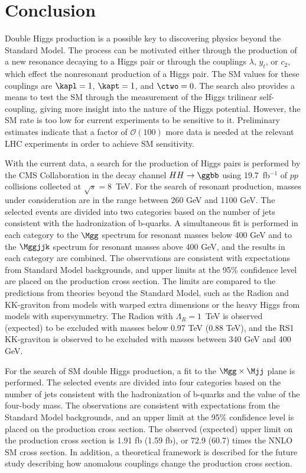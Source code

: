 
\chapter{Conclusion\label{ch:conclusion}}

Double Higgs production is a possible key to discovering physics beyond the Standard Model.
The process can be motivated either through the production of a new resonance decaying to
a Higgs pair or through the couplings $\lambda$, $y_t$, or $c_2$,
which effect the nonresonant production of a Higgs pair. The SM values for these couplings are
$\kapl = 1$, $\kapt = 1$, and $\ctwo = 0$. The search also provides a means
to test the SM through the measurement of the Higgs trilinear self-coupling, giving
more insight into the nature of the Higgs potential. However, the SM rate is too low
for current experiments to be sensitive to it. Preliminary estimates indicate that a factor of
$\mathcal{O}(100)$ more data is needed at the relevant LHC experiments in order to achieve
SM sensitivity.

With the current data, a search for the production of Higgs pairs is performed
by the CMS Collaboration in the decay channel $HH \rightarrow \ggbb$ using 19.7~fb$^{-1}$
of $pp$ collisions collected at $\sqrt{s} = 8$~TeV.
For the search of resonant production, masses under consideration are in the range between 260 GeV
and 1100 GeV. The selected events are divided into two categories based on the number of jets
consistent with the hadronization of b-quarks.
A simultaneous fit is performed in each category to the $\Mgg$ spectrum for resonant masses
below 400 GeV and to the $\Mggjjk$ spectrum for resonant masses above 400 GeV, and the results
in each category are combined. The observations are consistent with expectations from Standard
Model backgrounds, and upper limits at the 95\% confidence level are placed on the production
cross section. The limits are compared to the predictions from theories beyond the Standard Model,
such as the Radion and KK-graviton from models with warped extra dimensions or the heavy Higgs
from models with supersymmetry. The Radion with $\Lambda_R = 1$~TeV is observed (expected) to be
excluded with masses below 0.97 TeV (0.88 TeV), and the RS1 KK-graviton is observed to be
excluded with masses between 340 GeV and 400 GeV.

For the search of SM double Higgs production, a fit to the $\Mgg \times \Mjj$ plane 
is performed. The selected events are divided into four categories based on the number of jets
consistent with the hadronization of b-quarks and the value of the four-body mass.
The observations are consistent with expectations from the Standard Model backgrounds, and an
upper limit at the 95\% confidence level is placed on the production cross section.
The observed (expected) upper limit on the production cross section is 1.91 fb (1.59 fb),
or 72.9 (60.7) times the NNLO SM cross section. In addition, a theoretical framework is described
for the future study describing how anomalous couplings change the production cross section.
